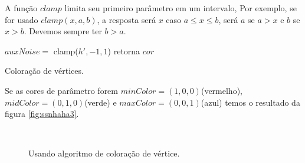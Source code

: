 A função $clamp$ limita seu primeiro parâmetro em um intervalo, Por exemplo, se for 
usado $clamp(x, a, b)$, a resposta será $x$ caso $a \leq x \leq b$, será $a$ se $a > x$ e $b$ se $x > b$.
Devemos sempre ter $b > a$.

\begin{algorithm}[H]\label{alg:colorValuation}
    $auxNoise =$ clamp($h', -1, 1$)\;
    retorna $cor$\;
    \caption{Coloração de vértices.}
\end{algorithm}

Se as cores de parâmetro forem $minColor = (1, 0, 0)$(vermelho), $midColor = (0, 1, 0)$(verde) e $maxColor = (0, 0, 1)$(azul)
temos o resultado da figura \ref{fig:ssnhaha3}.

\begin{figure}[H]
     \centering
     \\
     \hspace{0.1cm}
     \caption{Usando algoritmo de coloração de vértice.}
     \label{fig:color}
\end{figure}

